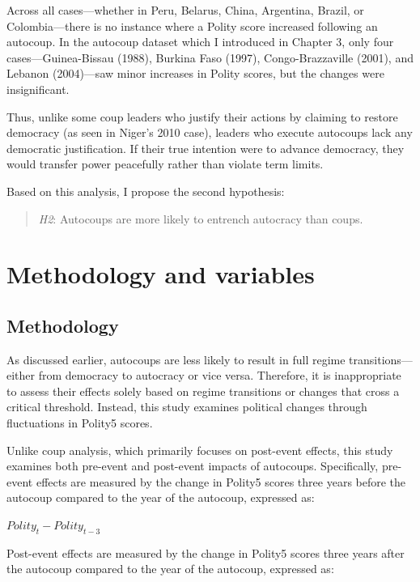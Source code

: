 \documentclass[
  12pt,
]{report}
\begin{document}
Across all cases---whether in Peru, Belarus, China, Argentina, Brazil,
or Colombia---there is no instance where a Polity score increased
following an autocoup. In the autocoup dataset which I introduced in
Chapter 3, only four cases---Guinea-Bissau (1988), Burkina Faso (1997),
Congo-Brazzaville (2001), and Lebanon (2004)---saw minor increases in
Polity scores, but the changes were insignificant.

Thus, unlike some coup leaders who justify their actions by claiming to
restore democracy (as seen in Niger's 2010 case), leaders who execute
autocoups lack any democratic justification. If their true intention
were to advance democracy, they would transfer power peacefully rather
than violate term limits.

Based on this analysis, I propose the second hypothesis:

\begin{quote}
\emph{H2}: Autocoups are more likely to entrench autocracy than coups.
\end{quote}

\section{Methodology and variables}\label{methodology-and-variables}

\subsection{Methodology}\label{methodology}

As discussed earlier, autocoups are less likely to result in full regime
transitions---either from democracy to autocracy or vice versa.
Therefore, it is inappropriate to assess their effects solely based on
regime transitions or changes that cross a critical threshold. Instead,
this study examines political changes through fluctuations in Polity5
scores.

Unlike coup analysis, which primarily focuses on post-event effects,
this study examines both pre-event and post-event impacts of autocoups.
Specifically, pre-event effects are measured by the change in Polity5
scores three years before the autocoup compared to the year of the
autocoup, expressed as:

\(Polity_t - Polity_{t-3}\)

Post-event effects are measured by the change in Polity5 scores three
years after the autocoup compared to the year of the autocoup, expressed
as:
\end{document}
